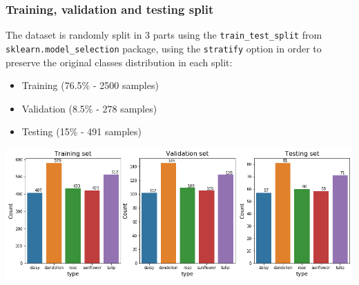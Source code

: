 \subsubsection{Training, validation and testing split}

The dataset is randomly split in 3 parts using the \texttt{train\_test\_split} from \texttt{sklearn.model\_selection} package, using the \texttt{stratify} option in order to preserve the original classes distribution in each split:

\begin{itemize}
	\setlength\itemsep{1pt}
	\setlength{\parskip}{0pt}
	\setlength{\parsep}{0pt}
	\item Training (76.5\% - 2500 samples)
	\item Validation (8.5\% - 278 samples)
	\item Testing (15\% - 491 samples)
\end{itemize}

%	
%
%

\begin{flushleft}
	\includegraphics[scale=.5]{./sections/03_methodology/output_18_0.png}
\end{flushleft}

